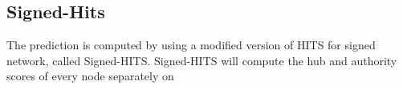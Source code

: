 
\subsection{Signed-Hits}

The prediction is computed by using a modified version of HITS for signed network, called Signed-HITS\cite{shahriari2014ranking}. Signed-HITS will compute the hub and authority scores of every node separately on 